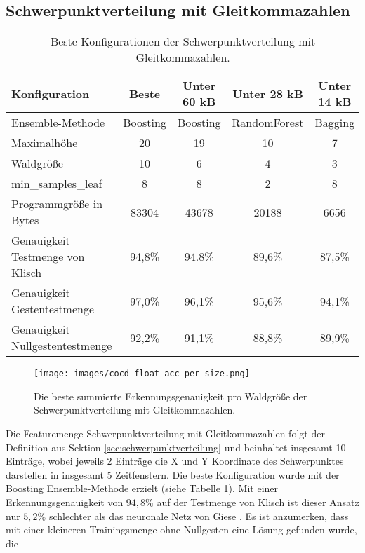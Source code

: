 \subsection{Schwerpunktverteilung mit Gleitkommazahlen}
\begin{table}[h!]
    \hspace{-0.5cm}
    \begin{tabular}{ | l | c | c | c | c |}
        \hline
        Konfiguration & Beste & Unter 60 kB & Unter 28 kB & Unter 14 kB \\\hline
        Ensemble-Methode & Boosting & Boosting & RandomForest & Bagging  \\\hline
        Maximalhöhe & 20 & 19 & 10 & 7 \\\hline
        Waldgröße & 10 & 6 & 4 & 3 \\\hline
        min\_samples\_leaf & 8 & 8 & 2 & 8 \\\hline
        Programmgröße in Bytes & 83304 & 43678 & 20188 & 6656 \\\hline
        Genauigkeit Testmenge von Klisch & 94,8\% & 94.8\% & 89,6\% & 87,5\% \\\hline
        Genauigkeit Gestentestmenge & 97,0\% & 96,1\% & 95,6\% & 94,1\% \\\hline
        Genauigkeit Nullgestentestmenge & 92,2\% & 91,1\% & 88,8\% & 89,9\% \\\hline
    \end{tabular}
    \caption{Beste Konfigurationen der Schwerpunktverteilung mit Gleitkommazahlen.}
    \label{tab:schwerpunktverteilung_float}
\end{table}
\begin{figure}[h!]
    \centering
    \texttt{[image: images/cocd\_float\_acc\_per\_size.png]}
    \caption{Die beste summierte Erkennungsgenauigkeit pro Waldgröße der Schwerpunktverteilung mit Gleitkommazahlen.}
    \label{fig:cocd_float_per_forest_size}
\end{figure}
Die Featuremenge Schwerpunktverteilung mit Gleitkommazahlen folgt der Definition aus Sektion \ref{sec:schwerpunktverteilung} und beinhaltet insgesamt 10 Einträge, wobei jeweils 2 Einträge die X und Y
Koordinate des Schwerpunktes darstellen in insgesamt 5 Zeitfenstern.
\newline
\newline
Die beste Konfiguration wurde mit der Boosting Ensemble-Methode erzielt (siehe Tabelle \ref{tab:schwerpunktverteilung_float}). Mit einer Erkennungsgenauigkeit von $94,8\%$ auf der Testmenge von Klisch
ist dieser Ansatz nur $5,2\%$ schlechter als das neuronale Netz von Giese \cite{gieseThesis}. Es ist anzumerken, dass mit einer kleineren Trainingsmenge ohne Nullgesten eine Lösung gefunden wurde, die
